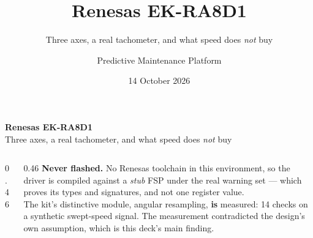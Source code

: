 \documentclass[aspectratio=169,10pt]{beamer}
\title[RA8D1 node]{Renesas EK-RA8D1}
\subtitle{Three axes, a real tachometer, and what speed does \emph{not} buy}
\author{Predictive Maintenance Platform}
\date{14 October 2026}
\begin{document}
\begin{frame}[plain]
  \vspace{5mm}
  {\LARGE\bfseries Renesas EK-RA8D1}\\[2mm]
  {\large\color{pdmink2} Three axes, a real tachometer, and what speed does
   \emph{not} buy}\par
  \vspace{5mm}\noindent{\color{pdmrule}\rule{\linewidth}{0.4pt}}\par
  \vspace{3mm}
  \begin{columns}[T]
    \begin{column}{0.46\textwidth}
      \scriptsize
      \\[1mm]
      \\[1mm]
      \\[1mm]
      \\[1mm]
      \\[1mm]
    \end{column}
    \begin{column}{0.46\textwidth}
      \scriptsize\color{pdmink2}
      \textbf{Never flashed.} No Renesas toolchain in this environment, so the
      driver is compiled against a \emph{stub} FSP under the real warning set
      --- which proves its types and signatures, and not one register value.
      \\[2mm]
      The kit's distinctive module, angular resampling, \textbf{is} measured:
      14 checks on a synthetic swept-speed signal. The measurement
      contradicted the design's own assumption, which is this deck's main
      finding.
    \end{column}
  \end{columns}
\end{frame}
\end{document}
